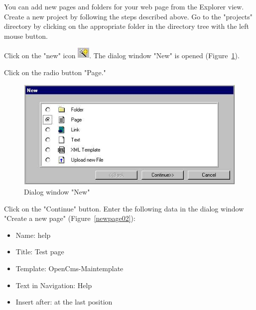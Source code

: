 You can add new pages and folders for your web page from the
Explorer view. Create a new project by following the steps
described above. Go to the "projects" directory by clicking on the
appropriate folder in the directory tree with the left mouse
button.

Click on the "new" icon
\includegraphics{pics/usermanual/ic_newres}. The dialog window
"New" is opened (Figure~\ref{newpage01}).

Click on the radio button "Page."

\begin{figure}[hbt]
\begin{center}
\includegraphics[width=\sgw]
                   {pics/usermanual/newPage01}
\caption[Dialog window "New"]
           {Dialog window "New"}
\label{newpage01}
\end{center}
\end{figure}

Click on the "Continue" button. Enter the following data in the
dialog window "Create a new page" (Figure~\ref{newpage02}):

\begin{itemize}
\item Name: help
\item Title: Test page
\item Template: OpenCms-Maintemplate
\item Text in Navigation: Help
\item Insert after: at the last position
\end{itemize}

